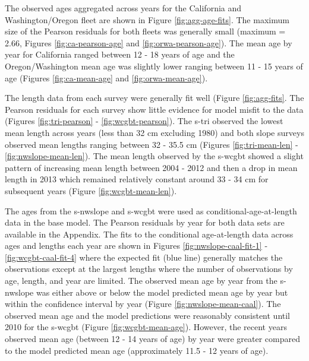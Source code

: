 \documentclass[11pt,
  english,
  a4paper,
]{article}
\begin{document}
\leavevmode\tagmcend\tagstructend\par


The observed ages aggregated across years for the California and Washington/Oregon fleet are shown in Figure \ref{fig:agg-age-fits}. The maximum size of the Pearson residuals for both fleets was generally small (maximum = 2.66, Figures \ref{fig:ca-pearson-age} and \ref{fig:orwa-pearson-age}). The mean age by year for California ranged between 12 - 18 years of age and the Oregon/Washington mean age was slightly lower ranging between 11 - 15 years of age (Figures \ref{fig:ca-mean-age} and \ref{fig:orwa-mean-age}).

\leavevmode\tagmcend\tagstructend\par


The length data from each survey were generally fit well (Figure \ref{fig:agg-fits}. The Pearson residuals for each survey show little evidence for model misfit to the data (Figures \ref{fig:tri-pearson} - \ref{fig:wcgbt-pearson}). The \gls{s-tri} observed the lowest mean length across years (less than 32 cm excluding 1980) and both slope surveys observed mean lengths ranging between 32 - 35.5 cm (Figures \ref{fig:tri-mean-len} - \ref{fig:nwslope-mean-len}). The mean length observed by the \gls{s-wcgbt} showed a slight pattern of increasing mean length between 2004 - 2012 and then a drop in mean length in 2013 which remained relatively constant around 33 - 34 cm for subsequent years (Figure \ref{fig:wcgbt-mean-len}).

\leavevmode\tagmcend\tagstructend\par


The ages from the \gls{s-nwslope} and \gls{s-wcgbt} were used as conditional-age-at-length data in the base model. The Pearson residuals by year for both data sets are available in the \protect\hypertarget{detailed-caal}{}{Appendix}. The fits to the conditional age-at-length data across ages and lengths each year are shown in Figures \ref{fig:nwslope-caal-fit-1} - \ref{fig:wcgbt-caal-fit-4} where the expected fit (blue line) generally matches the observations except at the largest lengths where the number of observations by age, length, and year are limited. The observed mean age by year from the \gls{s-nwslope} was either above or below the model predicted mean age by year but within the confidence interval by year (Figure \ref{fig:nwslope-mean-caal}). The observed mean age and the model predictions were reasonably consistent until 2010 for the \gls{s-wcgbt} (Figure \ref{fig:wcgbt-mean-age}). However, the recent years observed mean age (between 12 - 14 years of age) by year were greater compared to the model predicted mean age (approximately 11.5 - 12 years of age).
\end{document}
